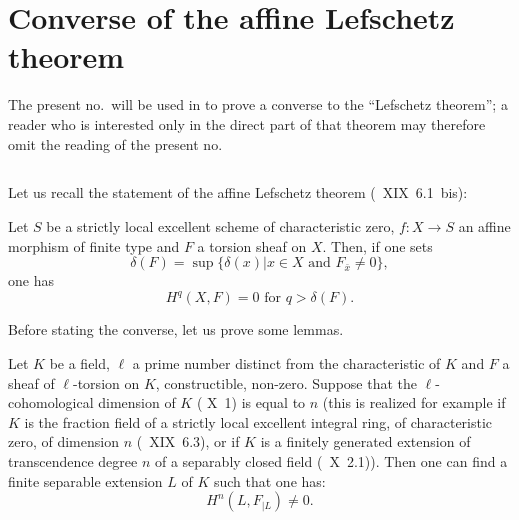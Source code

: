 \section{Converse of the affine Lefschetz theorem} \label{XIV.3}

The present no.\ will be used in \numero {} to prove a converse to the ``Lefschetz theorem''; a reader who is interested only in the direct part of that theorem may therefore omit the reading of the present no.

\subsection{} \label{XIV.3.1}

Let us recall the statement of the affine Lefschetz theorem (~XIX~6.1~bis):

Let $S$ be a strictly local excellent scheme of characteristic zero, $f:X\to S$ an affine morphism of finite type and $F$ a torsion sheaf on $X$. Then, if one sets
$$
\delta(F)=\sup\{\delta(x)|x\in X \text{ and } F_{\bar{x}} \neq 0\},
$$
one has
$$
H^q(X, F)=0 \text{ for } q>\delta(F).
$$

Before stating the converse, let us prove some lemmas.

\begin{lemma} \label{XIV.3.2} Let $K$ be a field, $\ell$ a prime number distinct from the characteristic of $K$ and $F$ a sheaf of $\ell$-torsion on $K$, constructible, non-zero. Suppose that the $\ell$-cohomological dimension of $K$ (\textup{ X~1}) is equal to $n$ (this is realized for example if $K$ is the fraction field of a strictly local excellent integral ring, of characteristic zero, of dimension $n$ (\textup{~XIX~6.3}), or if $K$ is a finitely generated extension of transcendence degree $n$ of a separably closed field (\textup{~X~2.1})). Then one can find a finite separable extension $L$ of $K$ such that one has:
$$H^n(L, F_{|L}) \neq 0.
$$
\end{lemma}

